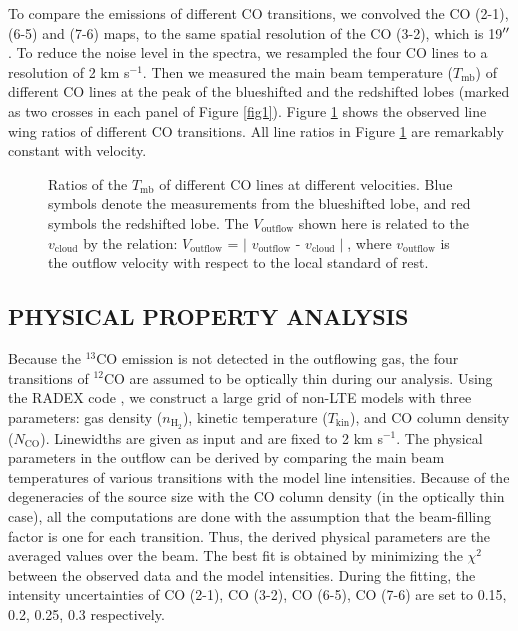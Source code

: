 To compare the emissions of different CO transitions, we convolved the CO (2-1), (6-5) and (7-6) maps, to the same spatial resolution of the CO (3-2), which is 19${\mbox{$^{\prime\prime}$}}$. To reduce the noise level in the spectra, we resampled the four CO lines to a resolution of 2 km s$^{-1}$. Then we measured the main beam temperature ($T_{\mathrm{mb}}$) of different CO lines at the peak of the blueshifted and the redshifted lobes (marked as two crosses in each panel of Figure \ref{fig1}). Figure \ref{fig2} shows the observed line wing ratios of different CO transitions.  All line ratios in Figure \ref{fig2} are remarkably constant with velocity.

\begin{figure}[tbp]
\caption{Ratios of the $T_{\mathrm{mb}}$ of different CO lines at different velocities. Blue symbols denote the measurements from the blueshifted lobe, and red symbols the redshifted lobe. The $V_{\mathrm{outflow}}$ shown here is related to the $v_{\mathrm{cloud}}$ by the relation: $V_{\mathrm{outflow}}$ = $\mid$ $v_{\mathrm{outflow}}$ - $v_{\mathrm{cloud}}\mid$, where $v_{\mathrm{outflow}}$ is the outflow velocity with respect to the local standard of rest. \label{fig2}}
\end{figure}

\subsection{PHYSICAL PROPERTY ANALYSIS}
Because the $^{13}$CO emission is not detected in the outflowing gas, the four transitions of $^{12}$CO are assumed to be optically thin during our analysis. Using the RADEX code \citep{2007A&A...468..627V}, we construct a large grid of non-LTE models with three parameters: gas density ($n_{\mathrm{H}_2}$), kinetic temperature ($T_{\mathrm{kin}}$), and CO column density ($N_{\mathrm{CO}}$). Linewidths are given as input and are fixed to 2 km s$^{-1}$. The physical parameters in the outflow can be derived by comparing the main beam temperatures of various transitions with the model line intensities. Because of the degeneracies of the source size with the CO column density (in the optically thin case), all the computations are done with the assumption that the beam-filling factor is one for each transition. Thus, the derived physical parameters are the averaged values over the beam. The best fit is obtained by minimizing the $\chi^2$ between the observed data and the model intensities. During the fitting, the intensity uncertainties of CO (2-1), CO (3-2), CO (6-5), CO (7-6) are set to 0.15, 0.2, 0.25, 0.3 respectively. 



